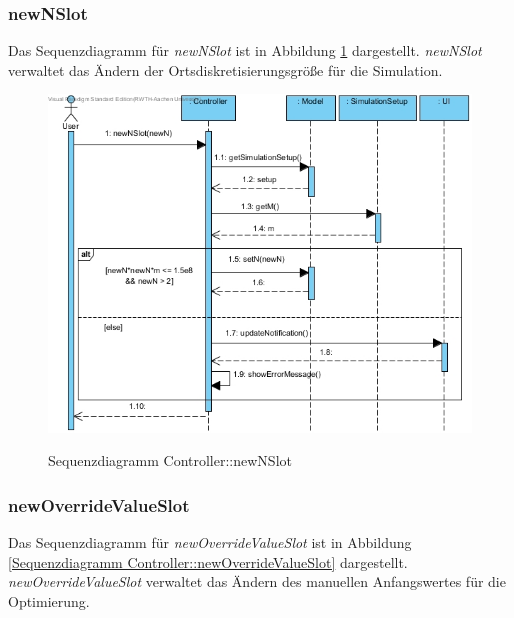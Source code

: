 \subsubsection*{newNSlot}

Das Sequenzdiagramm für \emph{newNSlot} ist in Abbildung \ref{Sequenzdiagramm Controller::newNSlot} dargestellt. \emph{newNSlot} verwaltet das Ändern der Ortsdiskretisierungsgröße für die Simulation.

\begin{figure}[H]
	\centering
	\includegraphics[scale=.65]{Bilder/Controller__newNSlot().jpg}\\
	\caption{Sequenzdiagramm Controller::newNSlot}
	\label{Sequenzdiagramm Controller::newNSlot}
\end{figure}

\subsubsection*{newOverrideValueSlot}

Das Sequenzdiagramm für \emph{newOverrideValueSlot} ist in Abbildung \ref{Sequenzdiagramm Controller::newOverrideValueSlot} dargestellt. \emph{newOverrideValueSlot} verwaltet das Ändern des manuellen Anfangswertes für die Optimierung.

